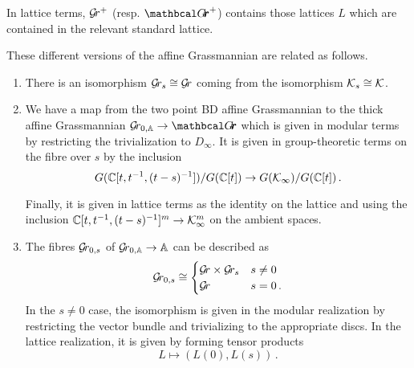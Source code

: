 \documentclass[draft]{article}
\begin{document}
\begin{itemize}
    In lattice terms, $ \mathcal{G}\!r^+$ (resp. ${\Grth}^+$) contains those lattices $L$ which are contained in the relevant standard lattice. 
\end{itemize}
These different versions of the affine Grassmannian are related as follows.  

\begin{enumerate}
    \item There is an isomorphism $ \mathcal{G}\!r_s \cong \mathcal{G}\!r $ coming from the isomorphism $ \mathcal K_s \cong \mathcal K$.
    \item We have a map from the two point BD affine Grassmannian to the thick affine Grassmannian $ \Grbd \rightarrow \Grth $
    which is given in modular terms by restricting the trivialization to $ D_\infty$.  It is given in group-theoretic terms on the fibre over $ s $ by the inclusion
    $$
    G(\mathbb C[t, t^{-1}, (t-s)^{-1}])/ G(\mathbb C[t]) \rightarrow G(\mathcal K_\infty)/G(\mathbb C[t])\,. 
    $$
    
    Finally, it is given in lattice terms as the identity on the lattice and using the inclusion $\mathbb C[t, t^{-1}, (t-s)^{-1}]^m \rightarrow \mathcal K_\infty^m$ on the ambient spaces.
    \item The fibres $ \mathcal{G}\!r_{0,s}$ of $ {\mathcal{G}\!r_{0,\mathbb A}} \rightarrow \mathbb A$ can be described as %
    $$
    \mathcal{G}\!r_{0,s} \cong 
    \begin{cases} 
        \mathcal{G}\!r \times \mathcal{G}\!r_s & s \ne 0 \\
        \mathcal{G}\!r              & s = 0\,.
    \end{cases}
    $$
    In the $s\ne 0$ case, the isomorphism is given in the modular realization by restricting the vector bundle and trivializing to the appropriate discs.  
    In the lattice realization, it is given by forming tensor products 
    $$
    L \mapsto (L(0), L(s))\,.
    $$
    

\end{enumerate}
\end{document}
